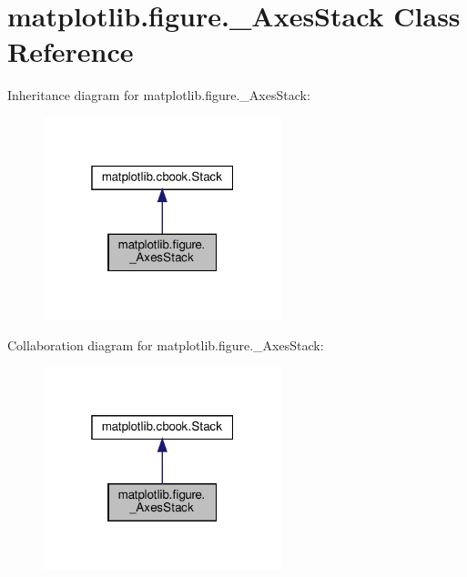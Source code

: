 \hypertarget{classmatplotlib_1_1figure_1_1__AxesStack}{}\section{matplotlib.\+figure.\+\_\+\+Axes\+Stack Class Reference}
\label{classmatplotlib_1_1figure_1_1__AxesStack}


Inheritance diagram for matplotlib.\+figure.\+\_\+\+Axes\+Stack\+:
\nopagebreak
\begin{figure}[H]
\begin{center}
\leavevmode
\includegraphics[width=196pt]{classmatplotlib_1_1figure_1_1__AxesStack__inherit__graph}
\end{center}
\end{figure}


Collaboration diagram for matplotlib.\+figure.\+\_\+\+Axes\+Stack\+:
\nopagebreak
\begin{figure}[H]
\begin{center}
\leavevmode
\includegraphics[width=196pt]{classmatplotlib_1_1figure_1_1__AxesStack__coll__graph}
\end{center}
\end{figure}
